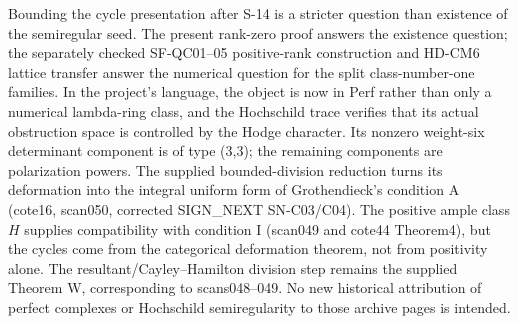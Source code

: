 Bounding the cycle presentation after S-14 is a stricter question than existence of the semiregular seed. The present rank-zero proof answers the existence question; the separately checked SF-QC01--05 positive-rank construction and HD-CM6 lattice transfer answer the numerical question for the split class-number-one families. In the project's language, the object is now in Perf rather than only a numerical lambda-ring class, and the Hochschild trace verifies that its actual obstruction space is controlled by the Hodge character. Its nonzero weight-six determinant component is of type (3,3); the remaining components are polarization powers. The supplied bounded-division reduction turns its deformation into the integral uniform form of Grothendieck's condition A (cote16, scan050, corrected SIGN\_NEXT SN-C03/C04). The positive ample class \(H\) supplies compatibility with condition I (scan049 and cote44 Theorem4), but the cycles come from the categorical deformation theorem, not from positivity alone. The resultant/Cayley--Hamilton division step remains the supplied Theorem W, corresponding to scans048--049. No new historical attribution of perfect complexes or Hochschild semiregularity to those archive pages is intended.
